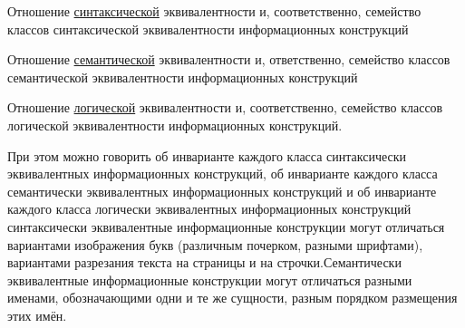 \begin{scnsubstruct}
{\begin{scnitemize}
            \item Отношение \uline{синтаксической} эквивалентности и, соответственно,
            семейство классов синтаксической эквивалентности информационных конструкций

            \item Отношение \uline{семантической} эквивалентности и, ответственно,
            семейство классов семантической эквивалентности информационных конструкций

            \item Отношение \uline{логической} эквивалентности и, соответственно, семейство
            классов логической эквивалентности информационных конструкций.

        \end{scnitemize}
        При этом можно говорить об инварианте каждого класса синтаксически
        эквивалентных информационных конструкций, об инварианте каждого класса
        семантически эквивалентных информационных конструкций и об инварианте каждого
        класса логически эквивалентных информационных конструкций синтаксически
        эквивалентные информационные конструкции могут отличаться вариантами
        изображения букв (различным почерком, разными шрифтами), вариантами разрезания
        текста на страницы и на строчки.Семантически эквивалентные информационные
        конструкции могут отличаться разными именами, обозначающими одни и те же
        сущности, разным порядком размещения этих имён.}

        
\end{scnsubstruct}
